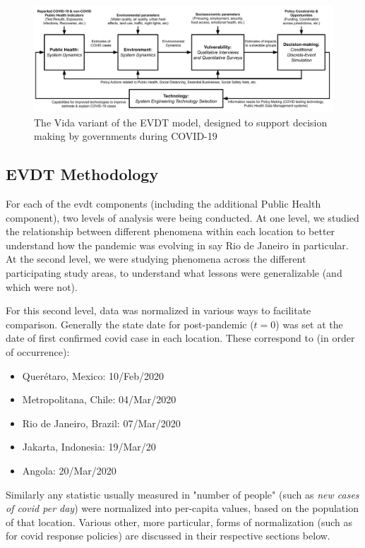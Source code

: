 \begin{figure}[!htb]
	\centering
	\includegraphics[scale=0.25]{Figures/chap5/Vida_Flowchart_v2.jpg}
	\caption[The Vida Variant of the EVDT Model]{The Vida variant of the EVDT model, designed to support decision making by governments during COVID-19}
	\label{fig:vida_flow}
\end{figure}

\subsection{EVDT Methodology} \label{sec:vida-evdt-method}

For each of the \ac{evdt} components (including the additional Public Health component), two levels of analysis were being conducted. At one level, we studied the relationship between different phenomena within each location to better understand how the pandemic was evolving in say Rio de Janeiro in particular. At the second level, we were studying phenomena across the different participating study areas, to understand what lessons were generalizable (and which were not). 

For this second level, data was normalized in various ways to facilitate comparison. Generally the state date for post-pandemic ($t=0$) was set at the date of first confirmed \ac{covid} case in each location. These correspond to (in order of occurrence):

 \begin{itemize}[itemsep=0pt,parsep=0pt]
	\item{Querétaro, Mexico: 10/Feb/2020}
	\item{Metropolitana, Chile: 04/Mar/2020}
	\item{Rio de Janeiro, Brazil: 07/Mar/2020}
	\item{Jakarta, Indonesia: 19/Mar/20}
	\item{Angola: 20/Mar/2020}
\end{itemize}

Similarly any statistic usually measured in "number of people" (such as \textit{new cases of \ac{covid} per day}) were normalized into per-capita values, based on the population of that location. Various other, more particular, forms of normalization (such as for \ac{covid} response policies) are discussed in their respective sections below.

